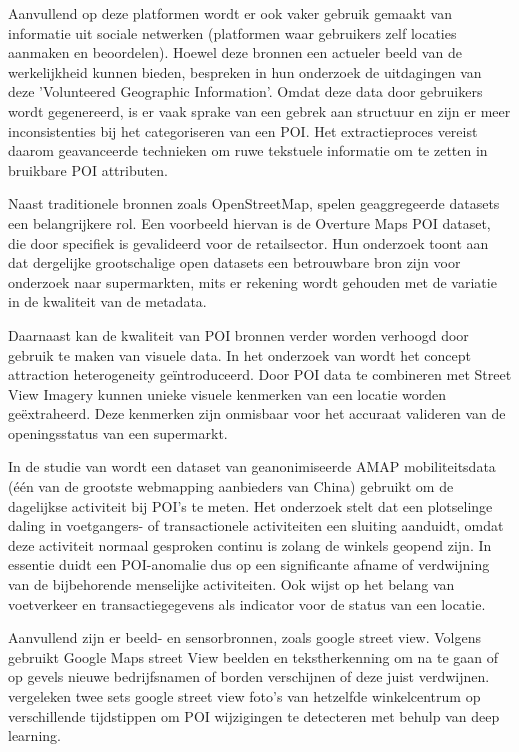 Aanvullend op deze platformen wordt er ook vaker gebruik gemaakt van informatie uit sociale netwerken (platformen waar gebruikers zelf locaties aanmaken en beoordelen). Hoewel deze bronnen een actueler beeld van de werkelijkheid kunnen bieden, bespreken \textcite{Jiang2015} in hun onderzoek de uitdagingen van deze 'Volunteered Geographic Information'. Omdat deze data door gebruikers wordt gegenereerd, is er vaak sprake van een gebrek aan structuur en zijn er meer inconsistenties bij het categoriseren van een POI. Het extractieproces vereist daarom geavanceerde technieken om ruwe tekstuele informatie om te zetten in bruikbare POI attributen.

Naast traditionele bronnen zoals OpenStreetMap, spelen geaggregeerde datasets een belangrijkere rol. Een voorbeeld hiervan is de Overture Maps POI dataset, die door \textcite{Ballantyne2024} specifiek is gevalideerd voor de retailsector. Hun onderzoek toont aan dat dergelijke grootschalige open datasets een betrouwbare bron zijn voor onderzoek naar supermarkten, mits er rekening wordt gehouden met de variatie in de kwaliteit van de metadata.

Daarnaast kan de kwaliteit van POI bronnen verder worden verhoogd door gebruik te maken van visuele data. In het onderzoek van \textcite{Qing2026} wordt het concept attraction heterogeneity geïntroduceerd. Door POI data te combineren met Street View Imagery kunnen unieke visuele kenmerken van een locatie worden geëxtraheerd. Deze kenmerken zijn onmisbaar voor het accuraat valideren van de openingsstatus van een supermarkt.

In de studie van \textcite{Yao2024} wordt een dataset van geanonimiseerde AMAP mobiliteitsdata (één van de grootste webmapping aanbieders van China) gebruikt om de dagelijkse activiteit bij POI’s te meten. Het onderzoek stelt dat een plotselinge daling in voetgangers- of transactionele activiteiten een sluiting aanduidt, omdat deze activiteit normaal gesproken continu is zolang de winkels geopend zijn. In essentie duidt een POI-anomalie dus op een significante afname of verdwijning van de bijbehorende menselijke activiteiten. Ook \textcite{Taylor2022} wijst op het belang van voetverkeer en transactiegegevens als indicator voor de status van een locatie.

Aanvullend zijn er beeld- en sensorbronnen, zoals google street view. Volgens \textcite{Pericolosi2022} gebruikt Google Maps street View beelden en tekstherkenning om na te gaan of op gevels nieuwe bedrijfsnamen of borden verschijnen of deze juist verdwijnen. \textcite{Revaud2019} vergeleken twee sets google street view foto’s van hetzelfde winkelcentrum op verschillende tijdstippen om POI wijzigingen te detecteren met behulp van deep learning. 

